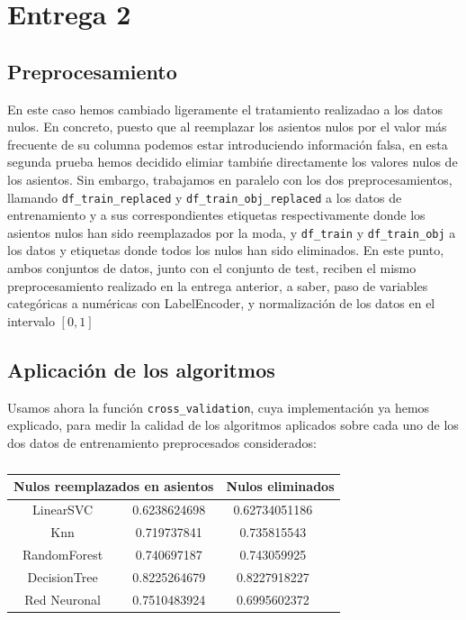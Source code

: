 \documentclass[a4paper,11pt]{article}
\begin{document}
\section{Entrega 2}
\subsection{Preprocesamiento}
En este caso hemos cambiado ligeramente el tratamiento realizadao a los datos nulos. En concreto, puesto que al reemplazar los asientos nulos por el valor más frecuente de su columna podemos estar introduciendo información falsa, en esta segunda prueba hemos decidido elimiar tambińe directamente los valores nulos de los asientos. Sin embargo, trabajamos en paralelo con los dos preprocesamientos, llamando \texttt{df_train_replaced} y \texttt{df_train_obj_replaced} a los datos de entrenamiento y a sus correspondientes etiquetas respectivamente donde los asientos nulos han sido reemplazados por la moda, y \texttt{df_train} y  \texttt{df_train_obj} a los datos y etiquetas donde todos los nulos han sido eliminados. 
En este punto, ambos conjuntos de datos, junto con el conjunto de test, reciben el mismo preprocesamiento realizado en la entrega anterior, a saber, paso de variables categóricas a numéricas con LabelEncoder, y normalización de los datos en el intervalo $[0,1]$
\subsection{Aplicación de los algoritmos}

Usamos ahora la función \texttt{cross_validation}, cuya implementación ya hemos explicado, para medir la calidad de los algoritmos aplicados sobre cada uno de los dos datos de entrenamiento preprocesados considerados:
\begin{table}[htbp]
	\caption{}\begin{center}
	
	\begin{tabular}{|c|c|c|l|}
		\hline
		\multicolumn{ 2}{|c|}{\textbf{Nulos reemplazados en asientos}} & \multicolumn{ 2}{c|}{\textbf{Nulos eliminados}} \\ \hline
		LinearSVC & 0.6238624698 & 0.62734051186 &  \\ \hline
		Knn & 0.719737841 & 0.735815543 &  \\ \hline
		RandomForest & 0.740697187 & 0.743059925 &  \\ \hline
		DecisionTree & 0.8225264679 & 0.8227918227 &  \\ \hline
		Red Neuronal & 0.7510483924 & 0.6995602372 &  \\ \hline
	\end{tabular}\end{center}
	\label{}
\end{table}
\end{document}

